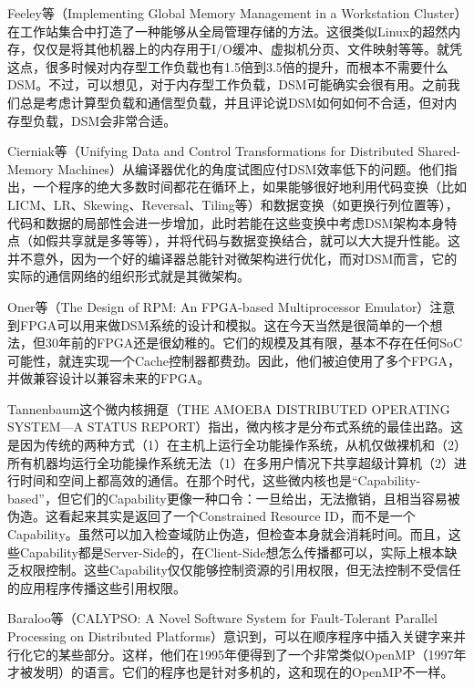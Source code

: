 \documentclass[a4paper,twoside]{scrbook}
\begin{document}
Feeley等（Implementing Global Memory Management in a Workstation Cluster）在工作站集合中打造了一种能够从全局管理存储的方法。这很类似Linux的超然内存，仅仅是将其他机器上的内存用于I/O缓冲、虚拟机分页、文件映射等等。就凭这点，很多时候对内存型工作负载也有1.5倍到3.5倍的提升，而根本不需要什么DSM。不过，可以想见，对于内存型工作负载，DSM可能确实会很有用。之前我们总是考虑计算型负载和通信型负载，并且评论说DSM如何如何不合适，但对内存型负载，DSM会非常合适。

Cierniak等（Unifying Data and Control Transformations for Distributed Shared-Memory Machines）从编译器优化的角度试图应付DSM效率低下的问题。他们指出，一个程序的绝大多数时间都花在循环上，如果能够很好地利用代码变换（比如LICM、LR、Skewing、Reversal、Tiling等）和数据变换（如更换行列位置等），代码和数据的局部性会进一步增加，此时若能在这些变换中考虑DSM架构本身特点（如假共享就是多等等），并将代码与数据变换结合，就可以大大提升性能。这并不意外，因为一个好的编译器总能针对微架构进行优化，而对DSM而言，它的实际的通信网络的组织形式就是其微架构。

Oner等（The Design of RPM: An FPGA-based Multiprocessor Emulator）注意到FPGA可以用来做DSM系统的设计和模拟。这在今天当然是很简单的一个想法，但30年前的FPGA还是很幼稚的。它们的规模及其有限，基本不存在任何SoC可能性，就连实现一个Cache控制器都费劲。因此，他们被迫使用了多个FPGA，并做兼容设计以兼容未来的FPGA。

Tannenbaum这个微内核拥趸（THE AMOEBA DISTRIBUTED OPERATING SYSTEM—A STATUS REPORT）指出，微内核才是分布式系统的最佳出路。这是因为传统的两种方式（1）在主机上运行全功能操作系统，从机仅做裸机和（2）所有机器均运行全功能操作系统无法（1）在多用户情况下共享超级计算机（2）进行时间和空间上都高效的通信。在那个时代，这些微内核也是“Capability-based”，但它们的Capability更像一种口令：一旦给出，无法撤销，且相当容易被伪造。这看起来其实是返回了一个Constrained Resource ID，而不是一个Capability。虽然可以加入检查域防止伪造，但检查本身就会消耗时间。而且，这些Capability都是Server-Side的，在Client-Side想怎么传播都可以，实际上根本缺乏权限控制。这些Capability仅仅能够控制资源的引用权限，但无法控制不受信任的应用程序传播这些引用权限。

Baraloo等（CALYPSO: A Novel Software System for Fault-Tolerant Parallel Processing on Distributed Platforms）意识到，可以在顺序程序中插入关键字来并行化它的某些部分。这样，他们在1995年便得到了一个非常类似OpenMP（1997年才被发明）的语言。它们的程序也是针对多机的，这和现在的OpenMP不一样。
\end{document}
